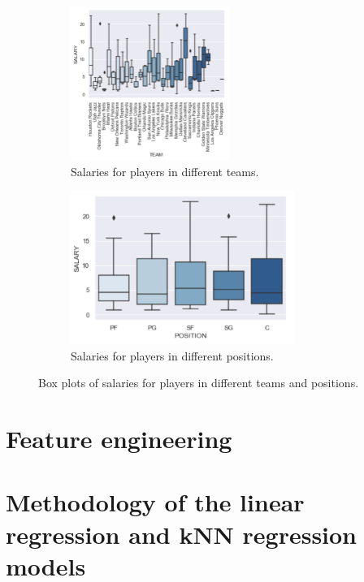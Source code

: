\documentclass[letterpaper,12pt,twoside,]{pinp}
\begin{document}
\begin{figure}[H]
\begin{subfigure}{0.55\textwidth}
\includegraphics[width=0.9\linewidth, height=5cm]{team_box.png} 
\caption{Salaries for players in different teams.}
\label{fig:subim1}
\end{subfigure}
\begin{subfigure}{0.55\textwidth}
\includegraphics[width=0.9\linewidth, height=5cm]{position_box.png}
\caption{Salaries for players in different positions.}
\label{fig:subim2}
\end{subfigure}
\caption{Box plots of salaries for players in different teams and positions.}
\end{figure}

\hypertarget{feature-engineering}{%
\section{Feature engineering}\label{feature-engineering}}

\hypertarget{methodology-of-the-linear-regression-and-knn-regression-models}{%
\section{Methodology of the linear regression and kNN regression
models}\label{methodology-of-the-linear-regression-and-knn-regression-models}}
\end{document}

